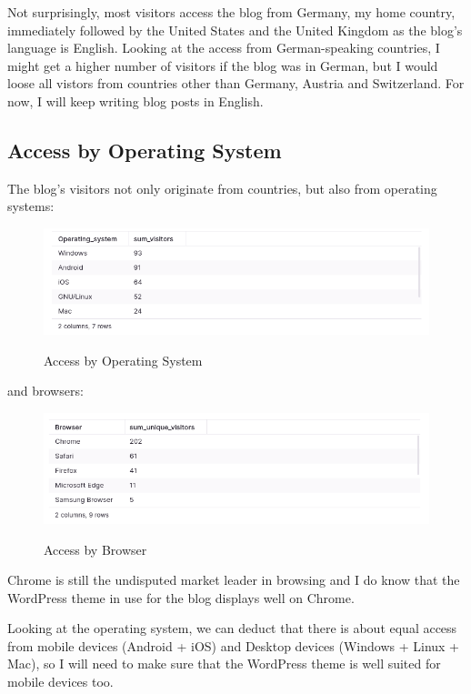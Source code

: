 Not surprisingly, most visitors access the blog from Germany, my home country, immediately followed by the United States and the United Kingdom as the blog's language is English. Looking at the access from German-speaking countries, I might get a higher number of visitors if the blog was in German, but I would loose all vistors from countries other than Germany, Austria and Switzerland. For now, I will keep writing blog posts in English.

\subsection{Access by Operating System}

The blog's visitors not only originate from countries, but also from operating systems:

\begin{figure}[H]
\centering
\caption {Access by Operating System}
\includegraphics[width=\linewidth]{images/access-os.png}
\label{fig:accessOS}
\end{figure}

and browsers:

\begin{figure}[H]
\centering
\caption {Access by Browser}
\includegraphics[width=\linewidth]{images/access-browser.png}
\label{fig:accessBrowser}
\end{figure}

Chrome is still the undisputed market leader in browsing and I do know that the WordPress theme in use for the blog displays well on Chrome. 

Looking at the operating system, we can deduct that there is about equal access from mobile devices (Android + iOS) and Desktop devices (Windows + Linux + Mac), so I will need to make sure that the WordPress theme is well suited for mobile devices too.

